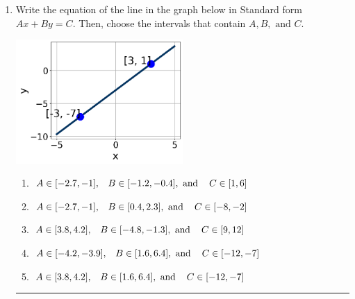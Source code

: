 \documentclass[14pt]{extbook}
\newcommand{\litem}[1]{\item#1\hspace*{-1cm}\rule{\textwidth}{0.4pt}}
\begin{document}
\begin{enumerate}
{\begin{enumerate}[label=\Alph*.]
\end{enumerate} }
\litem{
Write the equation of the line in the graph below in Standard form $Ax+By=C$. Then, choose the intervals that contain $A, B, \text{ and } C$.
\begin{center}
    \includegraphics[width=0.5\textwidth]{../Figures/linearGraphToStandardCopyB.png}
\end{center}
\begin{enumerate}[label=\Alph*.]
\item \( A \in [-2.7, -1], \hspace{3mm} B \in [-1.2, -0.4], \text{ and } \hspace{3mm} C \in [1, 6] \)
\item \( A \in [-2.7, -1], \hspace{3mm} B \in [0.4, 2.3], \text{ and } \hspace{3mm} C \in [-8, -2] \)
\item \( A \in [3.8, 4.2], \hspace{3mm} B \in [-4.8, -1.3], \text{ and } \hspace{3mm} C \in [9, 12] \)
\item \( A \in [-4.2, -3.9], \hspace{3mm} B \in [1.6, 6.4], \text{ and } \hspace{3mm} C \in [-12, -7] \)
\item \( A \in [3.8, 4.2], \hspace{3mm} B \in [1.6, 6.4], \text{ and } \hspace{3mm} C \in [-12, -7] \)


\end{enumerate}}
\end{enumerate}
\end{document}
